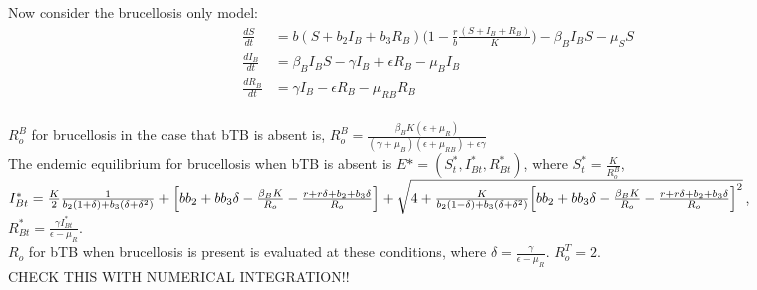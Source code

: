 \documentclass[letterpaper,12pt]{article}
\begin{document}
Now consider the brucellosis only model: 
\begin{align*}
\frac{dS}{dt} &= b (S+ b_2 I_{B} + b_3 R_{B}) \big(1 - \frac{r}{b} \frac{(S+ I_{B} + R_{B})}{K}\big)- \beta_B I_B S - \mu_{S} S  \\		      					%
\frac{dI_{B}}{dt}&=  \beta_B I_B S - \gamma I_{B} + \epsilon R_{B}  - \mu_{B} I_{B} \\ 		 					%
\frac{dR_{B}}{dt}&=  \gamma I_{B} - \epsilon R_{B} - \mu_{RB} R_{B} \\  										%
\end{align*}

$R_{o} ^B$ for brucellosis in the case that bTB is absent is, $R_{o}^{B} = \frac{\beta_B K (\epsilon + \mu_R)}{(\gamma + \mu_B) (\epsilon + \mu_{RB}) + \epsilon \gamma}$ \\
The endemic equilibrium for brucellosis when bTB is absent is $E* = (S_{t}^*, I_{Bt}^*, R_{Bt}^*)$, where 
$S_{t}^* = \frac{K}{R_{o} ^B}$, \\
$I_{Bt}^* = \frac{K}{2} \frac{1}{b_2(1+\delta)+ b_3 (\delta + \delta^2)} + \Big[b b_2 + b b_3 \delta - \frac{ \beta_B K}{R_o} - \frac{r + r \delta + b_2 + b_3 \delta}{R_o}\Big] +\\
 \sqrt{4 + \frac{K}{b_2 (1-\delta) + b_3 (\delta + \delta^2)} \Big[b b_2 + b b_3 \delta - \frac{ \beta_B K}{R_o} - \frac{r + r \delta + b_2 + b_3 \delta}{R_o}\Big] ^2}$,\\
$R_{Bt}^* =  \frac{\gamma I_{Bt}^*}{\epsilon - \mu_R}$. \\
$R_o$ for bTB when brucellosis is present is evaluated at these conditions, where $\delta = \frac{\gamma}{\epsilon - \mu_R}.$
$R_{o}^{T} = 2$. \\
CHECK THIS WITH NUMERICAL INTEGRATION!!
\end{document}
